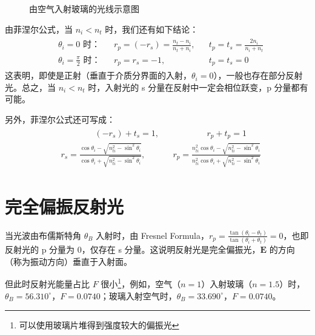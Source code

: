 \documentclass[UTF8]{report}
\theoremstyle{MyLineTheoremStyle} %
\theoremstyle{MyBlockTheoremStyle} %
\theoremstyle{MySubsubsectionStyle} %
\begin{document}
\begin{figure}[H]\centering

\caption{ 由空气入射玻璃的光线示意图}\label{反射示意图}
\end{figure}


由菲涅尔公式，当 $n_i < n_t$ 时，我们还有如下结论：
\begin{gather}
    \begin{aligned}
        &\text{$\theta_i = 0$ 时：} &&r_p = (-r_s)  = \frac{n_t - n_i}{n_t + n_i}, &&t_p = t_s = \frac{2n_i}{n_i + n_t} \\ 
        &\text{$\theta_i = \frac{\pi}{2}$ 时：} &&r_p = r_s  = -1,&&t_p = t_s  =0
    \end{aligned}
\end{gather}
这表明，即使是正射（垂直于介质分界面的入射，$\theta_i = 0$），一般也存在部分反射光。总之，当 $n_i < n_t$ 时，入射光的 s 分量在反射中一定会相位跃变，p 分量都有可能。

另外，菲涅尔公式还可写成：
\begin{gather}
\boxed{
\begin{aligned}
    &\quad\quad \quad \quad   (-r_s) + t_s  = 1, &&\quad 
    \quad \quad\quad   r_p + t_p = 1 
    \\ 
    &r_s = \frac{\cos \theta_i - \sqrt{n_{ti}^2 - \sin^2 \theta_i} }{\cos \theta_i + \sqrt{n_{ti}^2 - \sin^2 \theta_i}}, && r_p = \frac{n_{ti}^2\cos \theta_i - \sqrt{n_{ti}^2 - \sin^2 \theta_i} }{n_{ti}^2\cos \theta_i + \sqrt{n_{ti}^2 - \sin^2 \theta_i}}
\end{aligned}
}
\end{gather}

\section{完全偏振反射光}

当光波由布儒斯特角 $\theta_B$ 入射时，由 Fresnel Formula，$r_p = \frac{\tan (\theta_i - \theta_t)}{\tan (\theta_i + \theta_t)} = 0$，也即反射光的 p 分量为 0，仅存在 s 分量。这说明反射光是完全偏振光，$\boldsymbol{E}$ 的方向（称为振动方向）垂直于入射面。
{\par\color{gray}\small
但此时反射光能量占比 $F$ 很小\footnote{可以使用玻璃片堆得到强度较大的偏振光}，例如，空气（$n=1$）入射玻璃（$n = 1.5$）时，$\theta_B = 56.310^\circ$，$F =0.0740 $；玻璃入射空气时，$\theta_B = 33.690^\circ$，$F =0.0740 $。
\par}

\end{document}
